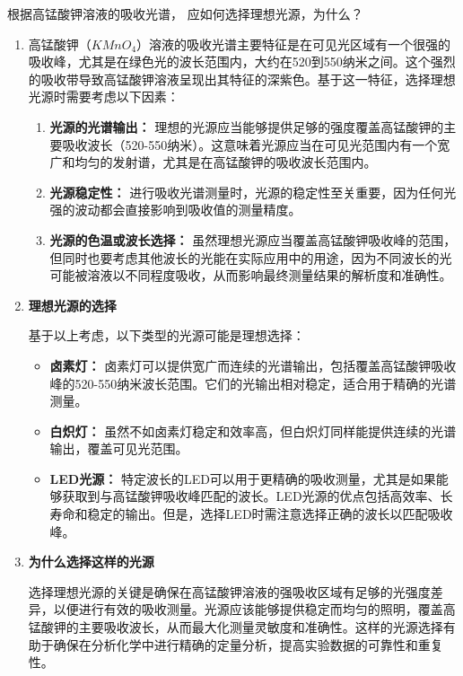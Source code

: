\documentclass[dvipsnames, svgnames,a4paper,11pt]{article}
\begin{document}
	\begin{question}
		根据高锰酸钾溶液的吸收光谱， 应如何选择理想光源，为什么？
	\end{question}
	\begin{enumerate}
		\item 高锰酸钾（$KMnO_4$）溶液的吸收光谱主要特征是在可见光区域有一个很强的吸收峰，尤其是在绿色光的波长范围内，大约在520到550纳米之间。这个强烈的吸收带导致高锰酸钾溶液呈现出其特征的深紫色。基于这一特征，选择理想光源时需要考虑以下因素：
		
		\begin{enumerate}
			\item \textbf{光源的光谱输出：} 理想的光源应当能够提供足够的强度覆盖高锰酸钾的主要吸收波长（520-550纳米）。这意味着光源应当在可见光范围内有一个宽广和均匀的发射谱，尤其是在高锰酸钾的吸收波长范围内。
			
			\item \textbf{光源稳定性：} 进行吸收光谱测量时，光源的稳定性至关重要，因为任何光强的波动都会直接影响到吸收值的测量精度。
			
			\item \textbf{光源的色温或波长选择：} 虽然理想光源应当覆盖高锰酸钾吸收峰的范围，但同时也要考虑其他波长的光能在实际应用中的用途，因为不同波长的光可能被溶液以不同程度吸收，从而影响最终测量结果的解析度和准确性。
		\end{enumerate}
		
		\item \textbf{理想光源的选择}
		
		基于以上考虑，以下类型的光源可能是理想选择：
		
		\begin{itemize}
			\item \textbf{卤素灯：} 卤素灯可以提供宽广而连续的光谱输出，包括覆盖高锰酸钾吸收峰的520-550纳米波长范围。它们的光输出相对稳定，适合用于精确的光谱测量。
			
			\item \textbf{白炽灯：} 虽然不如卤素灯稳定和效率高，但白炽灯同样能提供连续的光谱输出，覆盖可见光范围。
			
			\item \textbf{LED光源：} 特定波长的LED可以用于更精确的吸收测量，尤其是如果能够获取到与高锰酸钾吸收峰匹配的波长。LED光源的优点包括高效率、长寿命和稳定的输出。但是，选择LED时需注意选择正确的波长以匹配吸收峰。
		\end{itemize}
		
		\item \textbf{为什么选择这样的光源}
		
		选择理想光源的关键是确保在高锰酸钾溶液的强吸收区域有足够的光强度差异，以便进行有效的吸收测量。光源应该能够提供稳定而均匀的照明，覆盖高锰酸钾的主要吸收波长，从而最大化测量灵敏度和准确性。这样的光源选择有助于确保在分析化学中进行精确的定量分析，提高实验数据的可靠性和重复性。
	\end{enumerate}
	
\end{document}
